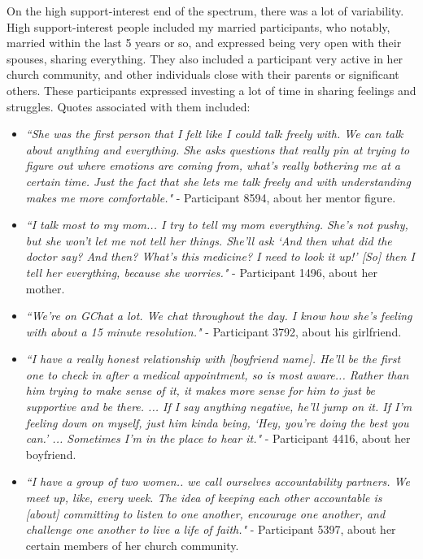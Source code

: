   On the high support-interest end of the spectrum, there was a lot of variability.
  High support-interest people included my married participants, who notably,
  married within the last 5 years or so,
  and expressed being very open with their spouses, sharing everything.
  They also included a participant very active in her church community,
  and other individuals close with their parents or significant others.
  These participants expressed investing a lot of time in
  sharing feelings and struggles.
  Quotes associated with them included:
  \begin{itemize}
  \item \textit{
  ``She was the first person that I felt like I could talk freely with.
  We can talk about anything and everything.
  She asks questions that really pin at trying to figure out
  where emotions are coming from, what's really bothering me at a certain time.
  Just the fact that she lets me talk freely and with understanding
  makes me more comfortable."
  }
  - Participant 8594, about her mentor figure.
  \item \textit{
  ``I talk most to my mom... I try to tell my mom everything.
  She's not pushy, but she won't let me not tell her things.
  She'll ask `And then what did the doctor say? And then?
  What's this medicine? I need to look it up!'
  [So] then I tell her everything, because she worries."
  }
  - Participant 1496, about her mother.
  \item  \textit{
  ``We're on GChat a lot.
  We chat throughout the day.
  I know how she's feeling with about a 15 minute resolution."
  }
  - Participant 3792, about his girlfriend.
  \item \textit{
  ``I have a really honest relationship with [boyfriend name].
  He'll be the first one to check in after a medical appointment,
  so is most aware...
  Rather than him trying to make sense of it,
  it makes more sense for him to just be supportive and be there.
  ... If I say anything negative, he'll jump on it.
  If I'm feeling down on myself,
  just him kinda being, `Hey, you're doing the best you can.'
  ... Sometimes I'm in the place to hear it."
  }
  - Participant 4416, about her boyfriend.
  \item \textit{
  ``I have a group of two women.. we call ourselves accountability partners.
  We meet up, like, every week.
  The idea of keeping each other accountable is
  [about] committing to listen to one another, encourage one another,
  and challenge one another to live a life of faith."
  }
  - Participant 5397, about her certain members of her church community.
  \end{itemize}

